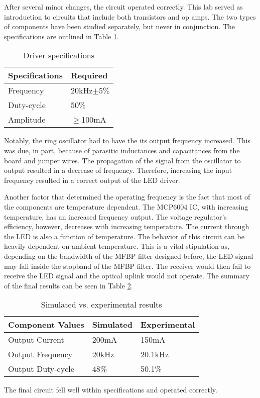 
After several minor changes, the circuit operated correctly. This lab served as introduction to circuits that include both transistors and op amps. The two types of components have been studied separately, but never in conjunction. The specifications are outlined in Table \ref{tab:specs}.

\begin{table}[H]
	\centering
	\caption{Driver specifications}
	\label{tab:specs}
	\begin{tabular}{|l|l|}
		\hline
		Specifications & Required       \\ \hline
		Frequency      & 20kHz$\pm 5\%$ \\ \hline
		Duty-cycle     & 50\%           \\ \hline
		Amplitude      & $\geq$100mA    \\ \hline
	\end{tabular}
\end{table}

Notably, the ring oscillator had to have the its output frequency increased. This was due, in part, because of parasitic inductances and capacitances from the board and jumper wires. The propagation of the signal from the oscillator to output resulted in a decrease of frequency. Therefore, increasing the input frequency resulted in a correct output of the LED driver.

Another factor that determined the operating frequency is the fact that most of the components are temperature dependent. The MCP6004 IC, with increasing temperature, has an increased frequency output. The voltage regulator's efficiency, however, decreases with increasing temperature. The current through the LED is also a function of temperature. The behavior of this circuit can be heavily dependent on ambient temperature. This is a vital stipulation as, depending on the bandwidth of the MFBP filter designed before, the LED signal may fall inside the stopband of the MFBP filter. The receiver would then fail to receive the LED signal and the optical uplink would not operate. The summary of the final results can be seen in Table \ref{tab:simvsexp}.


\begin{table}[H]
	\centering
	\caption{Simulated vs. experimental results}
	\label{tab:simvsexp}
	\begin{tabular}{|l|l|l|}
		\hline
		Component Values  & Simulated & Experimental \\ \hline
		Output Current    & 200mA     & 150mA        \\ \hline
		Output Frequency  & 20kHz     & 20.1kHz      \\ \hline
		Output Duty-cycle & 48\%      & 50.1\%       \\ \hline
	\end{tabular}
\end{table}

The final circuit fell well within specifications and operated correctly.



